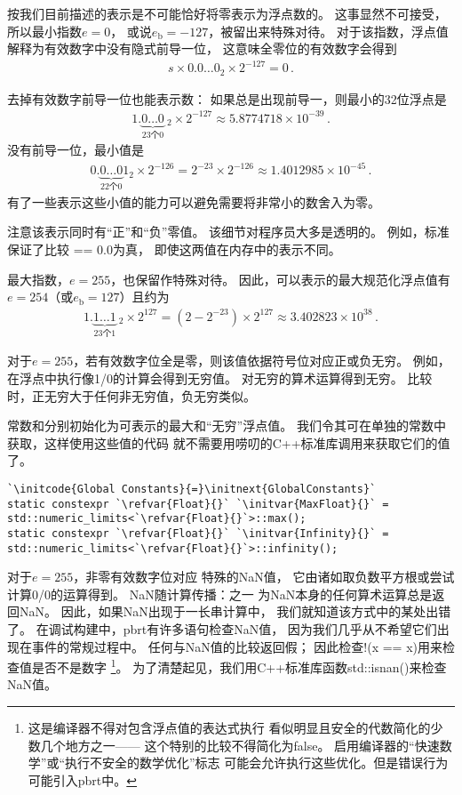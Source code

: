 按我们目前描述的表示是不可能恰好将零表示为浮点数的。
这事显然不可接受，所以最小指数$e=0$，
或说$e_{\mathrm{b}}=-127$，被留出来特殊对待。
对于该指数，浮点值解释为有效数字中没有隐式前导一位，
这意味全零位的有效数字会得到
\begin{align*}
    s\times0.0\ldots0_2\times2^{-127}=0\, .
\end{align*}

去掉有效数字前导一位也能表示数：
如果总是出现前导一，则最小的32位浮点是
\begin{align*}
    1.{\underbrace{0\ldots0}_{\text{23个0}}}\ _2\times2^{-127}\approx5.8774718\times10^{-39}\, .
\end{align*}
没有前导一位，最小值是
\begin{align*}
    0.\underbrace{0\ldots0}_{\text{22个0}}1_2\times2^{-126}=2^{-23}\times2^{-126}\approx1.4012985\times10^{-45}\, .
\end{align*}
有了一些表示这些小值的能力可以避免需要将非常小的数舍入为零。

注意该表示同时有“正”和“负”零值。
该细节对程序员大多是透明的。
例如，标准保证了比较{ == 0.0}为真，
即使这两值在内存中的表示不同。

最大指数，$e=255$，也保留作特殊对待。
因此，可以表示的最大规范化浮点值有$e=254$（或$e_{\mathrm{b}}=127$）且约为
\begin{align*}
    1.{\underbrace{1\ldots1}_{\text{23个1}}}\ _2\times2^{127}=(2-2^{-23})\times2^{127}\approx3.402823\times10^{38}\, .
\end{align*}

对于$e=255$，若有效数字位全是零，则该值依据符号位对应正或负无穷。
例如，在浮点中执行像1/0的计算会得到无穷值。
对无穷的算术运算得到无穷。
比较时，正无穷大于任何非无穷值，负无穷类似。

常数和分别初始化为可表示的最大和“无穷”浮点值。
我们令其可在单独的常数中获取，这样使用这些值的代码
就不需要用唠叨的C++标准库调用来获取它们的值了。
\begin{lstlisting}
`\initcode{Global Constants}{=}\initnext{GlobalConstants}`
static constexpr `\refvar{Float}{}` `\initvar{MaxFloat}{}` = std::numeric_limits<`\refvar{Float}{}`>::max();
static constexpr `\refvar{Float}{}` `\initvar{Infinity}{}` = std::numeric_limits<`\refvar{Float}{}`>::infinity();
\end{lstlisting}

对于$e=255$，非零有效数字位对应
特殊的NaN值，
它由诸如取负数平方根或尝试计算0/0的运算得到。
NaN随计算传播：之一
为NaN本身的任何算术运算总是返回NaN。
因此，如果NaN出现于一长串计算中，
我们就知道该方式中的某处出错了。
在调试构建中，pbrt有许多语句检查NaN值，
因为我们几乎从不希望它们出现在事件的常规过程中。
任何与NaN值的比较返回假；
因此检查{\ttfamily !(x == x)}用来检查值是否不是数字
\footnote{这是编译器不得对包含浮点值的表达式执行
看似明显且安全的代数简化的少数几个地方之一——
这个特别的比较不得简化为{\ttfamily false}。
启用编译器的“快速数学”或“执行不安全的数学优化”标志
可能会允许执行这些优化。但是错误行为可能引入pbrt中。}。
为了清楚起见，我们用C++标准库函数{\ttfamily std::isnan()}来检查NaN值。

